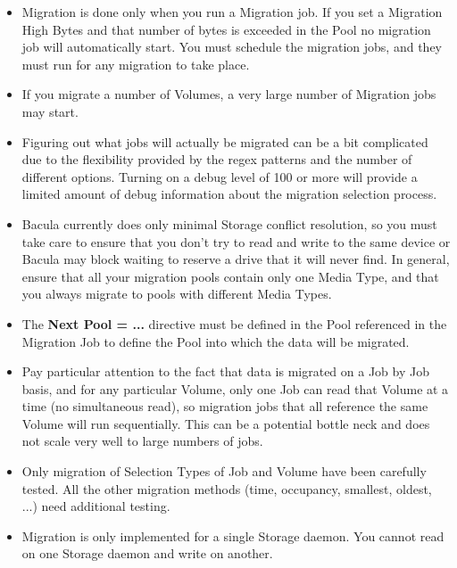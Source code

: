 \begin{itemize}
\item Migration is done only when you run a Migration job. If you set a
      Migration High Bytes and that number of bytes is exceeded in the Pool
      no migration job will automatically start.  You must schedule the 
      migration jobs, and they must run for any migration to take place.

\item If you migrate a number of Volumes, a very large number of Migration
      jobs may start. 

\item Figuring out what jobs will actually be migrated can be a bit complicated
      due to the flexibility provided by the regex patterns and the number of 
      different options.  Turning on a debug level of 100 or more will provide 
      a limited amount of debug information about the migration selection 
      process.

\item Bacula currently does only minimal Storage conflict resolution, so you
      must take care to ensure that you don't try to read and write to the
      same device or Bacula may block waiting to reserve a drive that it
      will never find. In general, ensure that all your migration
      pools contain only one Media Type, and that you always
      migrate to pools with different Media Types. 

\item The {\bf Next Pool = ...} directive must be defined in the Pool
     referenced in the Migration Job to define the Pool into which the
     data will be migrated.

\item Pay particular attention to the fact that data is migrated on a Job
     by Job basis, and for any particular Volume, only one Job can read
     that Volume at a time (no simultaneous read), so migration jobs that
     all reference the same Volume will run sequentially.  This can be a
     potential bottle neck and does not scale very well to large numbers
     of jobs.

\item Only migration of Selection Types of Job and Volume have 
     been carefully tested. All the other migration methods (time,
     occupancy, smallest, oldest, ...) need additional testing.

\item Migration is only implemented for a single Storage daemon.  You
     cannot read on one Storage daemon and write on another.
\end{itemize}



